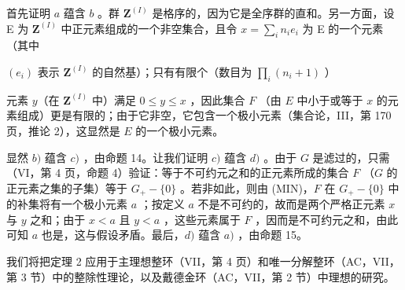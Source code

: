 首先证明 \(a\) 蕴含 \(b\) 。群 \(\mathbf{Z}^{(I)}\) 是格序的，因为它是全序群的直和。另一方面，设 E 为 \(\mathbf{Z}^{(I)}\) 中正元素组成的一个非空集合，且令 \(x = \sum_{i} n_i e_i\) 为 E 的一个元素（其中

\((e_{i})\) 表示 \(\mathbf{Z}^{(I)}\) 的自然基）；只有有限个（数目为 \(\prod_{i}(n_{i} + 1)\) ）

元素 \(y\)（在 \(\mathbf{Z}^{(I)}\) 中）满足 \(0 \leqslant y \leqslant x\) ，因此集合 \(F\) （由 \(E\) 中小于或等于 \(x\) 的元素组成）更是有限的；由于它非空，它包含一个极小元素（集合论，III，第 170 页，推论 2），这显然是 \(E\) 的一个极小元素。

显然 \(b)\) 蕴含 \(c)\) ，由命题 14。让我们证明 \(c)\) 蕴含 \(d)\) 。由于 \(G\) 是滤过的，只需（VI，第 4 页，命题 4）验证：等于不可约元之和的正元素所成的集合 \(F\) （\(G\) 的正元素之集的子集）等于 \(G_{+} - \{0\}\) 。若非如此，则由 (MIN)，\(F\) 在 \(G_{+} - \{0\}\) 中的补集将有一个极小元素 \(a\) ；按定义 \(a\) 不是不可约的，故而是两个严格正元素 \(x\) 与 \(y\) 之和；由于 \(x < a\) 且 \(y < a\) ，这些元素属于 \(F\) ，因而是不可约元之和，由此可知 \(a\) 也是，这与假设矛盾。最后，\(d)\) 蕴含 \(a)\) ，由命题 15。

我们将把定理 2 应用于主理想整环（VII，第 4 页）和唯一分解整环（AC，VII，第 3 节）中的整除性理论，以及戴德金环（AC，VII，第 2 节）中理想的研究。

